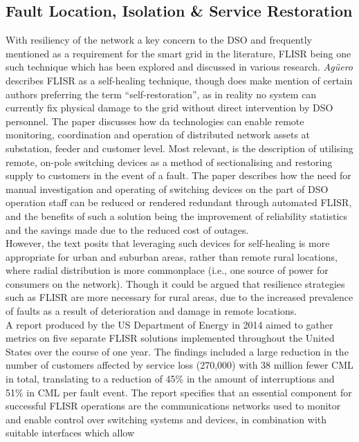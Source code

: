 \subsection{Fault Location, Isolation \& Service Restoration}
\label{sec:flisr}

With resiliency of the network a key concern to the DSO and frequently mentioned as a requirement for the smart grid in the literature, FLISR being one such technique which has been
explored and discussed in various research. \textit{Agüero} \cite{6344960} describes FLISR as a self-healing technique, though does make mention of certain authors preferring the term ``self-restoration'',
as in reality no system can currently fix physical damage to the grid without direct intervention by DSO personnel.
The paper discusses how \ac{da} technologies can enable remote monitoring, coordination and operation of distributed network assets at substation, feeder and customer level.
Most relevant, is the description of utilising remote, on-pole switching devices as a method of sectionalising and restoring supply to customers in the event of a fault.
The paper describes how the need for manual investigation and operating of switching devices on the part of DSO operation staff can be reduced or rendered redundant through automated FLISR,
and the benefits of such a solution being the improvement of reliability statistics and the savings made due to the reduced cost of outages.
\\
However, the text posits that leveraging such devices for self-healing is more appropriate for urban and suburban areas,
rather than remote rural locations, where radial distribution is more commonplace (i.e., one source of power for consumers on the network). Though it could be argued that resilience strategies such as FLISR are more
necessary for rural areas, due to the increased prevalence of faults as a result of deterioration and damage in remote locations.
\\
A report produced by the US Department of Energy in 2014 \cite{us_dept_energy}  aimed to gather metrics on five separate FLISR solutions implemented throughout the United States over the course of one year.
The findings included a large reduction in the number of customers affected by service loss (270,000) with 38 million fewer CML in total, translating to a reduction of 45\% in the amount of interruptions and 51\% in CML per fault event.
The report specifies that an essential component for successful FLISR operations are the communications networks used to monitor and enable control over switching systems and devices, in combination with suitable interfaces which allow
